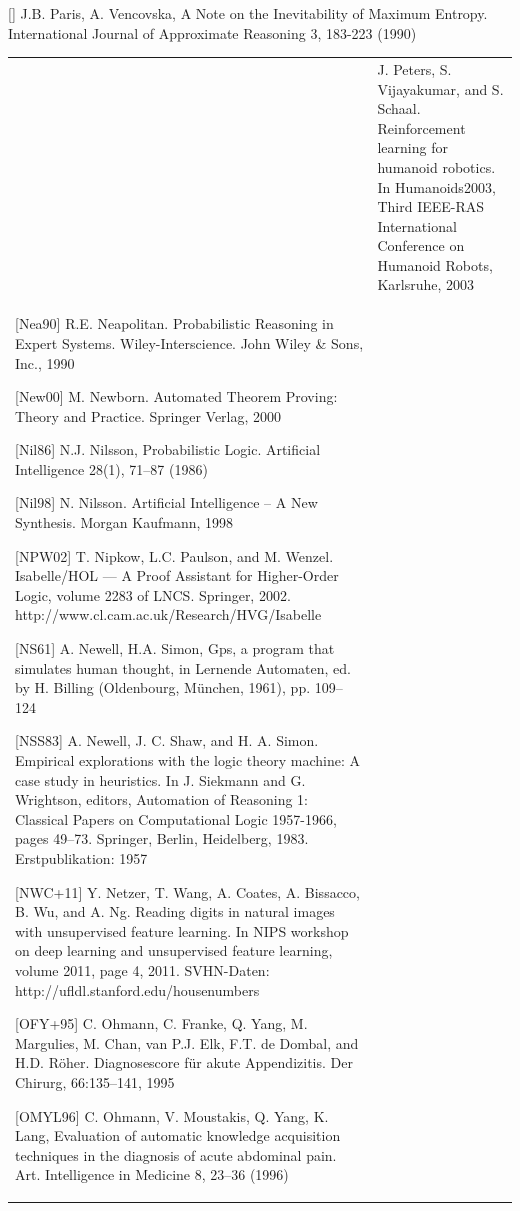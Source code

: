 \documentclass[10pt]{book}
\begin{document}
[\cite{paris1990inevitability}] J.B. Paris, A. Vencovska, A Note on the Inevitability of Maximum Entropy. International Journal of Approximate Reasoning 3, 183-223 (1990)
\begin{tabular}{|l|l|}
\hline [\cite{peters2003humanoid}] & J. Peters, S. Vijayakumar, and S. Schaal. Reinforcement learning for humanoid robotics. In Humanoids2003, Third IEEE-RAS International Conference on Humanoid Robots, Karlsruhe, 2003 \\
[Nea90] R.E. Neapolitan. Probabilistic Reasoning in Expert Systems. Wiley-Interscience. John Wiley \& Sons, Inc., 1990

[New00] M. Newborn. Automated Theorem Proving: Theory and Practice. Springer Verlag, 2000

[Nil86] N.J. Nilsson, Probabilistic Logic. Artificial Intelligence 28(1), 71–87 (1986)

[Nil98] N. Nilsson. Artificial Intelligence – A New Synthesis. Morgan Kaufmann, 1998

[NPW02] T. Nipkow, L.C. Paulson, and M. Wenzel. Isabelle/HOL — A Proof Assistant for Higher-Order Logic, volume 2283 of LNCS. Springer, 2002. http://www.cl.cam.ac.uk/Research/HVG/Isabelle

[NS61] A. Newell, H.A. Simon, Gps, a program that simulates human thought, in Lernende Automaten, ed. by H. Billing (Oldenbourg, München, 1961), pp. 109–124

[NSS83] A. Newell, J. C. Shaw, and H. A. Simon. Empirical explorations with the logic theory machine: A case study in heuristics. In J. Siekmann and G. Wrightson, editors, Automation of Reasoning 1: Classical Papers on Computational Logic 1957-1966, pages 49–73. Springer, Berlin, Heidelberg, 1983. Erstpublikation: 1957

[NWC+11] Y. Netzer, T. Wang, A. Coates, A. Bissacco, B. Wu, and A. Ng. Reading digits in natural images with unsupervised feature learning. In NIPS workshop on deep learning and unsupervised feature learning, volume 2011, page 4, 2011. SVHN-Daten: http://ufldl.stanford.edu/housenumbers

[OFY+95] C. Ohmann, C. Franke, Q. Yang, M. Margulies, M. Chan, van P.J. Elk, F.T. de Dombal, and H.D. Röher. Diagnosescore für akute Appendizitis. Der Chirurg, 66:135–141, 1995

[OMYL96] C. Ohmann, V. Moustakis, Q. Yang, K. Lang, Evaluation of automatic knowledge acquisition techniques in the diagnosis of acute abdominal pain. Art. Intelligence in Medicine 8, 23–36 (1996)


\end{tabular}
\end{document}

